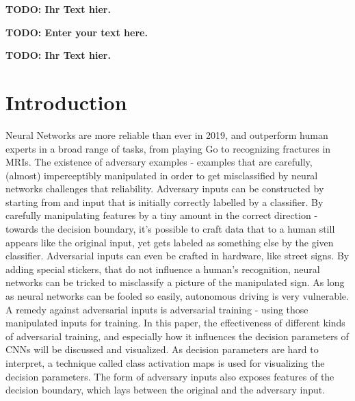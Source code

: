 \documentclass[draft,final]{vutinfth} %
\newcommand{\todo}[1]{{\color{red}\textbf{TODO: {#1}}}} %
\begin{document}
\frontmatter %

\addstatementpage

\begin{danksagung*}
\todo{Ihr Text hier.}
\end{danksagung*}

\begin{acknowledgements*}
\todo{Enter your text here.}
\end{acknowledgements*}

\begin{kurzfassung}
\todo{Ihr Text hier.}
\end{kurzfassung}

\begin{abstract}
\todo{Enter your text here.}
\end{abstract}


\tableofcontents %

\mainmatter

\chapter{Introduction}
Neural Networks are more reliable than ever in 2019, and outperform human experts in a broad range of tasks, from playing Go to recognizing fractures in MRIs. The existence of adversary examples - 
examples that are carefully, (almost) imperceptibly manipulated in order to get misclassified by neural networks challenges that reliability. Adversary inputs can be constructed by starting from
and input that is initially correctly labelled by a classifier. By carefully manipulating features by a tiny amount in the correct direction - towards the decision boundary, it's possible to
craft data that to a human still appears like the original input, yet gets labeled as something else by the given classifier. Adversarial inputs can even be crafted in hardware, like street signs. By adding special stickers, that do not influence a human's recognition, neural networks can be tricked to misclassify a picture of the manipulated sign. As long as neural networks can be fooled so easily, autonomous driving is very vulnerable.
A remedy against adversarial inputs is adversarial training - using those manipulated inputs for training.
In this paper, the effectiveness of different kinds of adversarial training, and especially how it influences the decision parameters of CNNs will be discussed and visualized. As decision parameters are hard to interpret, a technique called class activation maps is used for visualizing the decision parameters. The form of adversary inputs also exposes features of the decision boundary, which lays between the original and the adversary input.
\end{document}
